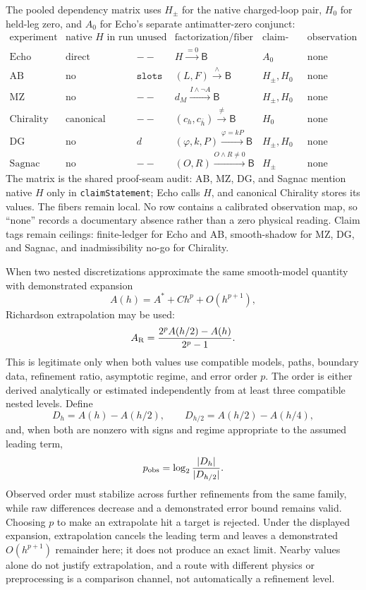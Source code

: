 The pooled dependency matrix uses \(H_\pm\) for the native charged-loop pair, \(H_0\) for held-leg zero, and \(A_0\)
for Echo's separate antimatter-zero conjunct:
\begingroup\scriptsize
\[
\begin{array}{lccccc}
\text{experiment}&\text{native }H\text{ in run}&\text{unused}&\text{factorization/fiber}&\text{claim-only}&\text{observation}\\[2pt]
\mathrm{Echo}&\text{direct}&--&H\xrightarrow{=0}\mathsf B&A_0&\text{none}\\
\mathrm{AB}&\text{no}&\texttt{slots}&(L,F)\xrightarrow{\land}\mathsf B&H_\pm,H_0&\text{none}\\
\mathrm{MZ}&\text{no}&--&d_M\xrightarrow{I\land\neg A}\mathsf B&H_\pm,H_0&\text{none}\\
\mathrm{Chirality}&\text{canonical embed}&--&(c_h,c_{\bar h})\xrightarrow{\ne}\mathsf B&H_0&\text{none}\\
\mathrm{DG}&\text{no}&d&(\varphi,k,P)\xrightarrow{\varphi=kP}\mathsf B&H_\pm,H_0&\text{none}\\
\mathrm{Sagnac}&\text{no}&--&(O,R)\xrightarrow{O\land R\ne0}\mathsf B&H_\pm&\text{none}
\end{array}
\]
\endgroup
The matrix is the shared proof-seam audit: AB, MZ, DG, and Sagnac mention native \(H\) only in \texttt{claimStatement};
Echo calls \(H\), and canonical Chirality stores its values.  The fibers remain local.  No row contains a calibrated
observation map, so ``none'' records a documentary absence rather than a zero physical reading.  Claim tags remain
ceilings: finite-ledger for Echo and AB, smooth-shadow for MZ, DG, and Sagnac, and inadmissibility no-go for Chirality.

When two nested discretizations approximate the same smooth-model quantity with demonstrated expansion
\[
                         A(h)=A^\ast+Ch^p+O(h^{p+1}),
\]
Richardson extrapolation may be used:
\[
                         A_{\rm R}=\frac{2^pA(h/2)-A(h)}{2^p-1}.
\]
This is legitimate only when both values use compatible models, paths, boundary data, refinement ratio, asymptotic
regime, and error order \(p\).  The order is either derived analytically or estimated independently from at least
three compatible nested levels.  Define
\[
D_h=A(h)-A(h/2),\qquad D_{h/2}=A(h/2)-A(h/4),
\]
and, when both are nonzero with signs and regime appropriate to the assumed leading term,
\[
                         p_{\rm obs}=\log_2\frac{|D_h|}{|D_{h/2}|}.
\]
Observed order must stabilize across further refinements from the same family, while raw differences decrease and a
demonstrated error bound remains valid.  Choosing \(p\) to make an extrapolate hit a target is rejected.  Under the
displayed expansion, extrapolation cancels the leading term and leaves a demonstrated \(O(h^{p+1})\) remainder here;
it does not produce an exact limit.  Nearby values alone do not justify extrapolation, and a route with different
physics or preprocessing is a comparison channel, not automatically a refinement level.

